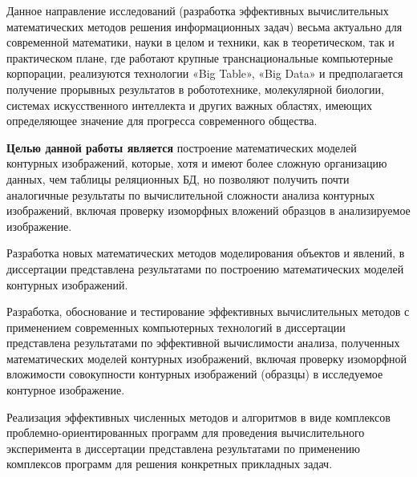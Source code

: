 Данное направление исследований (разработка эффективных вычислительных математических методов решения информационных задач) весьма актуально для современной математики, науки в целом и техники, как в теоретическом, так и  практическом плане, где работают крупные транснациональные компьютерные корпорации, реализуются технологии «Big Table»,  «Big Data» и предполагается получение прорывных результатов в робототехнике, молекулярной биологии, системах искусственного интеллекта и других важных областях, имеющих определяющее значение для прогресса современного общества.

\textbf{Целью данной работы является} построение математических моделей контурных изображений, которые, хотя и имеют более сложную организацию данных, чем  таблицы реляционных БД, но позволяют получить почти аналогичные результаты по вычислительной сложности  анализа контурных изображений, включая проверку изоморфных вложений образцов в анализируемое изображение.

Разработка новых математических методов моделирования объектов и явлений, в диссертации представлена результатами по построению математических моделей контурных изображений.

Разработка, обоснование и тестирование эффективных вычислительных методов с применением современных компьютерных технологий в диссертации представлена результатами по эффективной вычислимости анализа, полученных математических моделей контурных изображений, включая проверку изоморфной вложимости совокупности контурных изображений (образцы) в исследуемое контурное изображение.

Реализация эффективных численных методов и алгоритмов в виде комплексов проблемно-ориентированных программ для проведения вычислительного эксперимента в диссертации представлена результатами по применению комплексов программ для решения конкретных прикладных задач.

